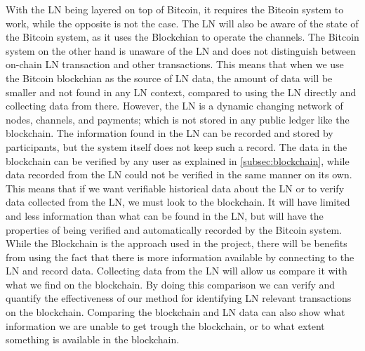 With the LN being layered on top of Bitcoin, it requires the Bitcoin system to work, while the opposite is not the case. The LN will also be aware of the state of the Bitcoin system, as it uses the Blockchian to operate the channels. The Bitcoin system on the other hand is unaware of the LN and does not distinguish between on-chain LN transaction and other transactions. This means that when we use the Bitcoin blockchian as the source of LN data, the amount of data will be smaller and not found in any LN context, compared to using the LN directly and collecting data from there. However, the LN is a dynamic changing network of nodes, channels, and payments; which is not stored in any public ledger like the blockchain. The information found in the LN can be recorded and stored by participants, but the system itself does not keep such a record. The data in the blockchain can be verified by any user as explained in \cref{subsec:blockchain}, while data recorded from the LN could not be verified in the same manner on its own.
This means that if we want verifiable historical data about the LN or to verify data collected from the LN, we must look to the blockchain. It will have limited and less information than what can be found in the LN, but will have the properties of being verified and automatically recorded by the Bitcoin system.
While the Blockchain is the approach used in the project, there will be benefits from using the fact that there is more information available by connecting to the LN and record data. Collecting data from the LN will allow us compare it with what we find on the blockchain. By doing this comparison we can verify and quantify the effectiveness of our method for identifying LN relevant transactions on the blockchain. Comparing the blockchain and LN data can also show what information we are unable to get trough the blockchain, or to what extent something is available in the blockchain.  
\\


